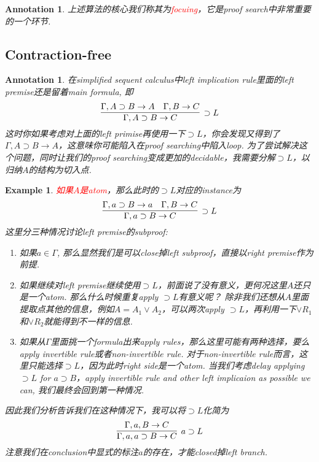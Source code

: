 \documentclass{article}
\theoremstyle{plain}
\newtheorem{example}[theorem]{Example}
\newtheorem{annotation}[theorem]{Annotation}
\theoremstyle{nonumberplain}
\newcommand{\redt}[1]{\textcolor{red}{#1}}
\begin{document}
\begin{annotation}
\rm 上述算法的核心我们称其为\redt{focuing}，它是proof search中非常重要的一个环节. 
\end{annotation}


\newpage
\subsection{Contraction-free}

\begin{annotation}
\rm 在simplified sequent calculus中left implication rule里面的left premise还是留着main formula, 即
$$
\infer[\supset L]{\Gamma, A \supset B \to C}{\Gamma, A \supset B \to A & \Gamma, B \to C}
$$
这时你如果考虑对上面的left primise再使用一下$\supset L$，你会发现又得到了$\Gamma, A \supset B \to A$，这意味你可能陷入在proof searching中陷入loop. 为了尝试解决这个问题，同时让我们的proof searching变成更加的decidable，我需要分解$\supset L$，以归纳$A$的结构为切入点.
\end{annotation}

\begin{example}
\rm \redt{如果$A$是atom}，那么此时的$\supset L$对应的instance为
$$
\infer[\supset L]{\Gamma, a \supset B \to C}{\Gamma, a \supset B \to a & \Gamma, B \to C}
$$
这里分三种情况讨论left premise的subproof:
\begin{enumerate}
	\item 如果$a \in \Gamma$, 那么显然我们是可以close掉left subproof，直接以right premise作为前提. 
	\item 如果继续对left premise继续使用$\supset L$，前面说了没有意义，更何况这里$A$还只是一个atom.  那么什么时候重复apply $\supset L$有意义呢？ 除非我们还想从$A$里面提取点其他的信息，例如$A = A_1 \vee A_2$，可以两次apply $\supset L$，再利用一下$\vee R_1$和$\vee R_2$就能得到不一样的信息.
	\item 如果从$\Gamma$里面挑一个formula出来apply rules，那么这里可能有两种选择，要么apply invertible rule或者non-invertible rule. 对于non-invertible rule而言，这里只能选择$\supset L$，因为此时right side是一个atom. 当我们考虑delay applying $\supset L$ for $a \supset B$，apply invertible rule and other left implicaion as possible we can, 我们最终会回到第一种情况. 
\end{enumerate}
因此我们分析告诉我们在这种情况下，我可以将$\supset L$化简为
$$
\infer[a \supset L]{\Gamma,a,a \supset B \to C}{\Gamma,a, B \to C}
$$
注意我们在conclusion中显式的标注$a$的存在，才能closed掉left branch. 
\end{example}
\end{document}
